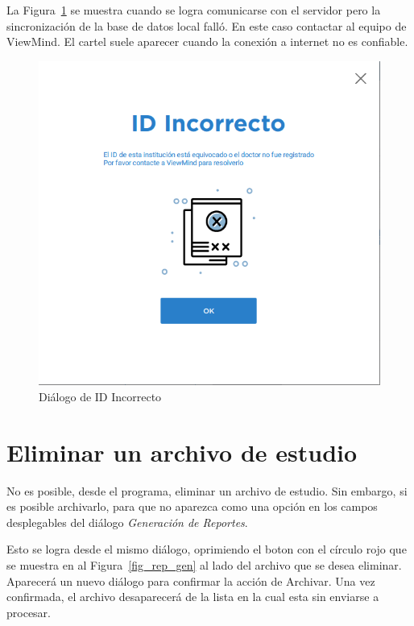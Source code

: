\documentclass[a4paper,10pt]{article}
\begin{document}
La Figura~\ref{fig_id_err} se muestra cuando se logra comunicarse con el servidor pero la sincronización de la base de datos local falló. En este caso contactar al equipo de ViewMind. El cartel suele aparecer cuando la conexión a internet no es confiable.

\begin{figure}[!h]
\centering
\includegraphics[scale = 0.3]{incorrect_id.png}
\caption{Diálogo de ID Incorrecto}
\label{fig_id_err}
\end{figure}

\section{Eliminar un archivo de estudio}

No es posible, desde el programa, eliminar un archivo de estudio. Sin embargo, si es posible archivarlo, para que no aparezca como una opción en los campos desplegables del diálogo \textit{Generación de Reportes}.

Esto se logra desde el mismo diálogo, oprimiendo el boton con el círculo rojo que se muestra en al Figura~\ref{fig_rep_gen} al lado del archivo que se desea eliminar. Aparecerá un nuevo diálogo para confirmar la acción de Archivar. Una vez confirmada, el archivo desaparecerá de la lista en la cual esta sin enviarse a procesar. 
\end{document}
